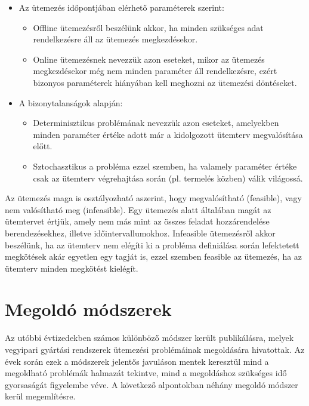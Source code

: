 \begin{itemize}
\item Az ütemezés időpontjában elérhető paraméterek szerint:
\begin{itemize}
\item Offline ütemezésről beszélünk akkor, ha minden szükséges adat rendelkezésre áll az ütemezés megkezdésekor.
\item Online ütemezésnek nevezzük azon eseteket, mikor az ütemezés megkezdésekor még nem minden paraméter áll rendelkezésre, ezért bizonyos paraméterek hiányában kell meghozni az ütemezési döntéseket.
\end{itemize} 
\item A bizonytalanságok alapján:
\begin{itemize}
\item Determinisztikus problémának nevezzük azon eseteket, amelyekben minden paraméter értéke adott már a kidolgozott ütemterv megvalósítása előtt.
\item Sztochasztikus a probléma ezzel szemben, ha valamely paraméter értéke csak az ütemterv végrehajtása során (pl. termelés közben) válik világossá.
\end{itemize}
\end{itemize}
Az ütemezés maga is osztályozható aszerint, hogy megvalósítható (feasible), vagy nem valósítható meg (infeasible).
Egy ütemezés alatt általában magát az ütemtervet értjük, amely nem más mint az összes feladat hozzárendelése berendezésekhez, illetve időintervallumokhoz.
Infeasible ütemezésről akkor beszélünk, ha az ütemterv nem elégíti ki a probléma definiálása során lefektetett megkötések akár egyetlen egy tagját is, ezzel szemben feasible az ütemezés, ha az ütemterv minden megkötést kielégít.
\section{Megoldó módszerek}
Az utóbbi évtizedekben számos különböző módszer került publikálásra, melyek vegyipari gyártási rendszerek ütemezési problémáinak megoldására hivatottak.
Az évek során ezek a módszerek jelentős javuláson mentek keresztül mind a megoldható problémák halmazát tekintve, mind a megoldáshoz szükséges idő gyorsaságát figyelembe véve.
A következő alpontokban néhány megoldó módszer kerül megemlítésre.
